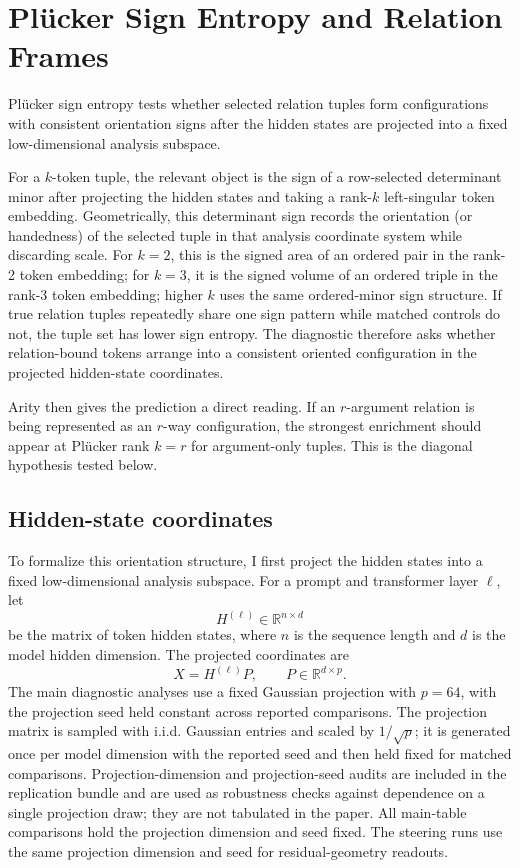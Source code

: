 \documentclass[11pt]{article}
\newcommand{\R}{\mathbb{R}}
\begin{document}
\section{Pl\"ucker Sign Entropy and Relation Frames}

Pl\"ucker sign entropy tests whether selected relation tuples form configurations with consistent orientation signs after the hidden states are projected into a fixed low-dimensional analysis subspace.

For a $k$-token tuple, the relevant object is the sign of a row-selected determinant minor after projecting the hidden states and taking a rank-$k$ left-singular token embedding. Geometrically, this determinant sign records the orientation (or handedness) of the selected tuple in that analysis coordinate system while discarding scale. For $k=2$, this is the signed area of an ordered pair in the rank-2 token embedding; for $k=3$, it is the signed volume of an ordered triple in the rank-3 token embedding; higher $k$ uses the same ordered-minor sign structure. If true relation tuples repeatedly share one sign pattern while matched controls do not, the tuple set has lower sign entropy. The diagnostic therefore asks whether relation-bound tokens arrange into a consistent oriented configuration in the projected hidden-state coordinates.

Arity then gives the prediction a direct reading. If an $r$-argument relation is being represented as an $r$-way configuration, the strongest enrichment should appear at Pl\"ucker rank $k=r$ for argument-only tuples. This is the diagonal hypothesis tested below.

\subsection{Hidden-state coordinates}

To formalize this orientation structure, I first project the hidden states into a fixed low-dimensional analysis subspace. For a prompt and transformer layer $\ell$, let
\begin{equation}
H^{(\ell)} \in \R^{n \times d}
\end{equation}
be the matrix of token hidden states, where $n$ is the sequence length and $d$ is the model hidden dimension. The projected coordinates are
\begin{equation}
X = H^{(\ell)}P, \qquad P \in \R^{d \times p}.
\end{equation}
The main diagnostic analyses use a fixed Gaussian projection with $p=64$, with the projection seed held constant across reported comparisons. The projection matrix is sampled with i.i.d. Gaussian entries and scaled by $1/\sqrt{p}$; it is generated once per model dimension with the reported seed and then held fixed for matched comparisons. Projection-dimension and projection-seed audits are included in the replication bundle and are used as robustness checks against dependence on a single projection draw; they are not tabulated in the paper. All main-table comparisons hold the projection dimension and seed fixed. The steering runs use the same projection dimension and seed for residual-geometry readouts.
\end{document}
